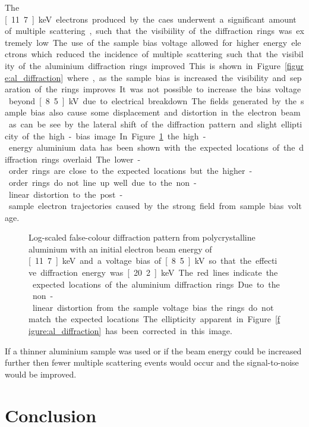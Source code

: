 The \unit[11.7]{keV} electrons produced by the \gls{caes} underwent a significant amount of multiple scattering, such that the visibiility of the diffraction rings was extremely low.
The use of the sample bias voltage allowed for higher energy electrons which reduced the incidence of multiple scattering such that the visibility of the aluminium diffraction rings improved.
This is shown in Figure~\ref{figure:al_diffraction} where, as the sample bias is increased the visibility and separation of the rings improves.
It was not possible to increase the bias voltage beyond \unit[8.5]{kV} due to electrical breakdown.
The fields generated by the sample bias also cause some displacement and distortion in the electron beam as can be see by the lateral shift of the diffraction pattern and slight ellipticity of the high-bias image.

In Figure~\ref{figure:al_diffraction_rings} the high-energy aluminium data has been shown with the expected locations of the diffraction rings overlaid.
The lower-order rings are close to the expected locations but the higher-order rings do not line up well due to the non-linear distortion to the post-sample electron trajectories caused by the strong field from sample bias voltage.

\begin{figure}
    \center
    
    \caption[Diffraction pattern from aluminium demonstrating the distortion from the voltage bias.]{Log-scaled false-colour diffraction pattern from polycrystalline aluminium with an initial electron beam energy of \unit[11.7]{keV} and a voltage bias of \unit[8.5]{kV} so that the effective diffraction energy was \unit[20.2]{keV}. The red lines indicate the expected locations of the aluminium diffraction rings. Due to the non-linear distortion from the sample voltage bias the rings do not match the expected locations. The ellipticity apparent in Figure~\ref{figure:al_diffraction} has been corrected in this image.}
    \label{figure:al_diffraction_rings}
\end{figure}

If a thinner aluminium sample was used or if the beam energy could be increased further then fewer multiple scattering events would occur and the signal-to-noise would be improved.

\section{Conclusion}

